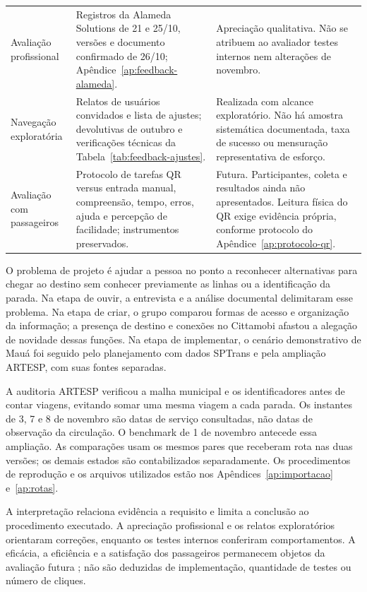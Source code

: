 \begin{longtable}{>{\raggedright\arraybackslash}p{2.6cm}p{5.7cm}p{6.4cm}}
Avaliação profissional & Registros da Alameda Solutions de 21 e 25/10, versões e documento confirmado de 26/10; Apêndice~\ref{ap:feedback-alameda}. & Apreciação qualitativa. Não se atribuem ao avaliador testes internos nem alterações de novembro.\\[5pt]
Navegação exploratória & Relatos de usuários convidados e lista de ajustes; devolutivas de outubro e verificações técnicas da Tabela~\ref{tab:feedback-ajustes}. & Realizada com alcance exploratório. Não há amostra sistemática documentada, taxa de sucesso ou mensuração representativa de esforço.\\[5pt]
Avaliação com passageiros & Protocolo de tarefas QR versus entrada manual, compreensão, tempo, erros, ajuda e percepção de facilidade; instrumentos preservados. & Futura. Participantes, coleta e resultados ainda não apresentados. Leitura física do QR exige evidência própria, conforme protocolo do Apêndice~\ref{ap:protocolo-qr}.\\
\end{longtable}
\endgroup
O problema de projeto é ajudar a pessoa no ponto a reconhecer alternativas para chegar ao destino sem conhecer previamente as linhas ou a identificação da parada. Na etapa de ouvir, a entrevista e a análise documental delimitaram esse problema. Na etapa de criar, o grupo comparou formas de acesso e organização da informação; a presença de destino e conexões no Cittamobi afastou a alegação de novidade dessas funções. Na etapa de implementar, o cenário demonstrativo de Mauá foi seguido pelo planejamento com dados SPTrans e pela ampliação ARTESP, com suas fontes separadas.

A auditoria ARTESP verificou a malha municipal e os identificadores antes de contar viagens, evitando somar uma mesma viagem a cada parada. Os instantes de 3, 7 e 8 de novembro são datas de serviço consultadas, não datas de observação da circulação. O benchmark de 1 de novembro antecede essa ampliação. As comparações usam os mesmos pares que receberam rota nas duas versões; os demais estados são contabilizados separadamente. Os procedimentos de reprodução e os arquivos utilizados estão nos Apêndices~\ref{ap:importacao} e~\ref{ap:rotas}.

A interpretação relaciona evidência a requisito e limita a conclusão ao procedimento executado. A apreciação profissional e os relatos exploratórios orientaram correções, enquanto os testes internos conferiram comportamentos. A eficácia, a eficiência e a satisfação dos passageiros permanecem objetos da avaliação futura \citep{iso924111}; não são deduzidas de implementação, quantidade de testes ou número de cliques.

